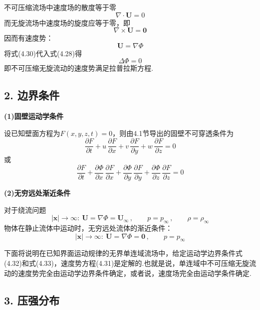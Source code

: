 不可压缩流场中速度场的散度等于零
\begin{equation*}
\nabla\cdot\boldsymbol{U}=0
\tag{4.28}
\end{equation*}
而无旋流场中速度场的旋度应等于零，即
\begin{equation*}
\nabla\times\boldsymbol{U}=\boldsymbol{0}
\tag{4.29}
\end{equation*}
因而有速度势：
\begin{equation*}
\boldsymbol{U}=\nabla\Phi
\tag{4.30}
\end{equation*}
将式(4.30)代入式(4.28)得
\begin{equation*}
\Delta\Phi=0
\tag{4.31}
\end{equation*}
即不可压缩无旋流动的速度势满足拉普拉斯方程.

\subsection*{2. 边界条件}

\textbf{(1)固壁运动学条件}

设已知壁面方程为$F(x,y,z,t)=0$，则由4.1节导出的固壁不可穿透条件为
\[
\frac{\partial F}{\partial t}+u\,\frac{\partial F}{\partial x}+v\,\frac{\partial F}{\partial y}+w\,\frac{\partial F}{\partial z}=0
\]
或
\begin{equation*}
\frac{\partial F}{\partial t}+\frac{\partial\Phi}{\partial x}\,\frac{\partial F}{\partial x}+\frac{\partial\Phi}{\partial y}\,\frac{\partial F}{\partial y}+\frac{\partial\Phi}{\partial z}\,\frac{\partial F}{\partial z}=0
\tag{4.32}
\end{equation*}

\textbf{(2)无穷远处渐近条件}

对于绕流问题
\begin{equation*}
|\boldsymbol{x}|\to\infty:\ \boldsymbol{U}=\nabla\Phi=\boldsymbol{U}_\infty\,,\qquad p=p_\infty\,,\qquad \rho=\rho_\infty
\tag{4.33a}
\end{equation*}
物体在静止流体中运动时，无穷远处流体的渐近条件：
\begin{equation*}
|\boldsymbol{x}|\to\infty:\ \boldsymbol{U}=\nabla\Phi=\boldsymbol{0}\,,\qquad p=p_\infty
\tag{4.33b}
\end{equation*}

下面将说明在已知界面运动规律的无界单连域流场中，给定运动学边界条件式(4.32)和式(4.33)，速度势方程(4.31)是定解的.也就是说，单连域中不可压缩无旋流动的速度势完全由运动学边界条件确定，或者说，速度场完全由运动学条件确定.

\subsection*{3. 压强分布}


